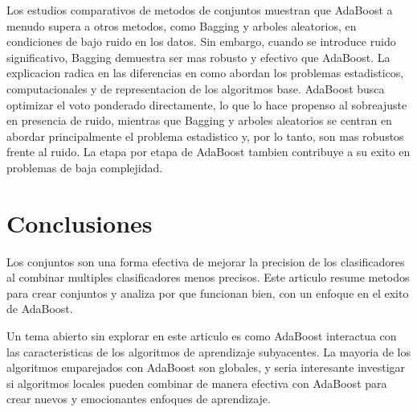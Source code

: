 \documentclass{esannV2}
\begin{document}
Los estudios comparativos de metodos de conjuntos muestran que AdaBoost a menudo supera a otros metodos, como Bagging y arboles aleatorios, en condiciones de bajo ruido en los datos. Sin embargo, cuando se introduce ruido significativo, Bagging demuestra ser mas robusto y efectivo que AdaBoost. La explicacion radica en las diferencias en como abordan los problemas estadisticos, computacionales y de representacion de los algoritmos base. AdaBoost busca optimizar el voto ponderado directamente, lo que lo hace propenso al sobreajuste en presencia de ruido, mientras que Bagging y arboles aleatorios se centran en abordar principalmente el problema estadistico y, por lo tanto, son mas robustos frente al ruido. La etapa por etapa de AdaBoost tambien contribuye a su exito en problemas de baja complejidad.

\section{Conclusiones }

Los conjuntos son una forma efectiva de mejorar la precision de los clasificadores al combinar multiples clasificadores menos precisos. Este articulo resume metodos para crear conjuntos y analiza por que funcionan bien, con un enfoque en el exito de AdaBoost.

Un tema abierto sin explorar en este articulo es como AdaBoost interactua con las caracteristicas de los algoritmos de aprendizaje subyacentes. La mayoria de los algoritmos emparejados con AdaBoost son globales, y seria interesante investigar si algoritmos locales pueden combinar de manera efectiva con AdaBoost para crear nuevos y emocionantes enfoques de aprendizaje.
\end{document}

